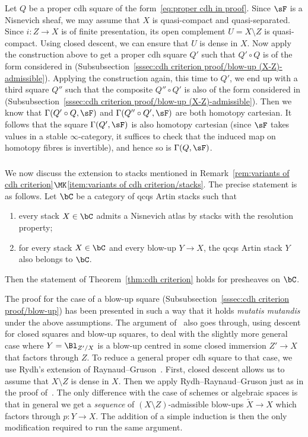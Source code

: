 Let $Q$ be a proper cdh square of the form~\eqref{eq:proper cdh in proof}. Since $\sF$ is a Nisnevich sheaf, we may assume that $X$ is quasi-compact and quasi-separated. Since $i : Z \to X$ is of finite presentation, its open complement $U = X\setminus Z$ is quasi-compact. Using closed descent, we can ensure that $U$ is dense in $X$. Now apply the construction above to get a proper cdh square $Q'$ such that $Q'\circ Q$ is of the form considered in (Subsubsection~\ref{sssec:cdh criterion proof/blow-up (X-Z)-admissible}). Applying the construction again, this time to $Q'$, we end up with a third square $Q''$ such that the composite $Q'' \circ Q'$ is also of the form considered in (Subsubsection~\ref{sssec:cdh criterion proof/blow-up (X-Z)-admissible}). Then we know that $\Gamma(Q'\circ Q, \sF)$ and $\Gamma(Q''\circ Q', \sF)$ are both homotopy cartesian. It follows that the square $\Gamma(Q', \sF)$ is also homotopy cartesian (since $\sF$ takes values in a stable $\infty$-category, it suffices to check that the induced map on homotopy fibres is invertible), and hence so is $\Gamma(Q, \sF)$.

\subsubsection{}\label{sssec:cdh stacks}

We now discuss the extension to stacks mentioned in Remark~\ref{rem:variants of cdh criterion}$\MK$\eqref{item:variants of cdh criterion/stacks}. The precise statement is as follows. Let $\bC$ be a category of qcqs Artin stacks such that
\begin{enumerate}\alphenumi
\item every stack $X\in\bC$ admits a Nisnevich atlas by stacks with the resolution property;
\item for every stack $X\in\bC$ and every blow-up $Y \to X$, the qcqs Artin stack $Y$ also belongs to $\bC$.
\end{enumerate}
Then the statement of Theorem~\ref{thm:cdh criterion} holds for presheaves on $\bC$.

The proof for the case of a blow-up square (Subsubsection~\ref{sssec:cdh criterion proof/blow-up}) has been presented in such a way that it holds \emph{mutatis mutandis} under the above assumptions. The argument of~\cite[Claim~5.3]{KerzStrunkTamme} also goes through, using descent for closed squares and blow-up squares, to deal with the slightly more general case where $Y = \Bl_{Z'/X}$ is a blow-up centred in some closed immersion $Z' \to X$ that factors through $Z$. To reduce a general proper cdh square to that case, we use Rydh's extension of Raynaud--Gruson~\cite[Theorem~2.2]{HoyoisKrishna}. First, closed descent allows us to assume that $X\setminus Z$ is dense in $X$. Then we apply Rydh--Raynaud--Gruson just as in the proof of~\cite[Corollary~2.4]{HoyoisKrishna}. The only difference with the case of schemes or algebraic spaces is that in general we get a \emph{sequence} of $(X\setminus Z)$-admissible blow-ups $\tilde{X} \to X$ which factors through $p : Y \to X$. The addition of a simple induction is then the only modification required to run the same argument.

